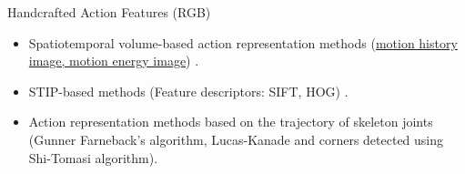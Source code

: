 \begin{frame}{Handcrafted Action Features (RGB)}
    \begin{itemize}
        \item<1-> Spatiotemporal volume-based action representation methods (\href{https://web.cse.ohio-state.edu/~davis.1719/CVL/Research/MHI/mhi.html}{motion history image, motion energy image}) \cite{li2011human}.
        \item<2-> STIP-based methods (Feature descriptors: SIFT, HOG) \cite{nguyen2014stap}.
        \item<3-> Action representation methods based on the trajectory of skeleton joints (Gunner Farneback’s algorithm, Lucas-Kanade and corners detected using Shi-Tomasi algorithm).
    \end{itemize}
\end{frame}

